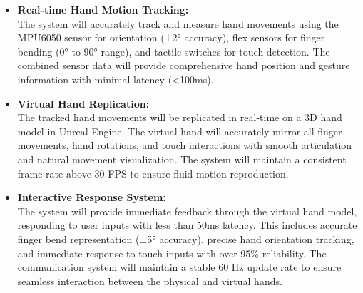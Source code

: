 

\begin{itemize}
    \item \textbf{Real-time Hand Motion Tracking:} \\
    The system will accurately track and measure hand movements using the MPU6050 sensor for orientation (±2° accuracy), flex sensors for finger bending (0° to 90° range), and tactile switches for touch detection. The combined sensor data will provide comprehensive hand position and gesture information with minimal latency (<100ms).

    \item \textbf{Virtual Hand Replication:} \\
    The tracked hand movements will be replicated in real-time on a 3D hand model in Unreal Engine. The virtual hand will accurately mirror all finger movements, hand rotations, and touch interactions with smooth articulation and natural movement visualization. The system will maintain a consistent frame rate above 30 FPS to ensure fluid motion reproduction.

    \item \textbf{Interactive Response System:} \\
    The system will provide immediate feedback through the virtual hand model, responding to user inputs with less than 50ms latency. This includes accurate finger bend representation (±5° accuracy), precise hand orientation tracking, and immediate response to touch inputs with over 95\% reliability. The communication system will maintain a stable 60 Hz update rate to ensure seamless interaction between the physical and virtual hands.
\end{itemize}
